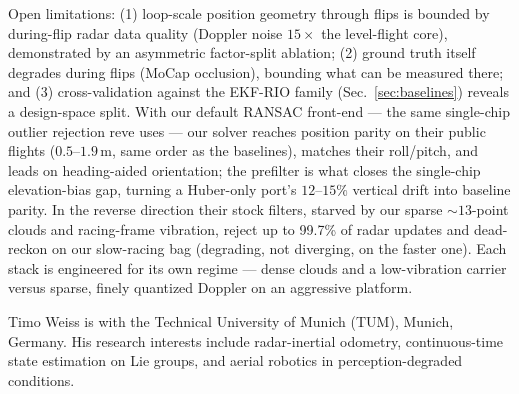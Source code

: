 \documentclass[journal]{IEEEtran}
\begin{document}
Open limitations: (1) loop-scale position geometry through flips is
bounded by during-flip radar data quality (Doppler noise
$15\times$ the level-flight core), demonstrated by an asymmetric
factor-split ablation; (2) ground truth itself degrades during flips
(MoCap occlusion), bounding what can be measured there; and
(3) cross-validation against the EKF-RIO family
(Sec.~\ref{sec:baselines}) reveals a design-space split.  With our
default RANSAC front-end --- the same single-chip outlier rejection
\mbox{reve} uses --- our solver reaches position parity on their public
flights ($0.5$--$1.9$\,m, same order as the baselines), matches their
roll/pitch, and leads on heading-aided orientation; the prefilter is
what closes the single-chip elevation-bias gap, turning a Huber-only
port's $12$--$15\%$ vertical drift into baseline parity.  In the reverse
direction their stock filters, starved by our sparse ${\sim}13$-point
clouds and racing-frame vibration, reject up to 99.7\% of radar updates
and dead-reckon on our slow-racing bag (degrading, not diverging, on the
faster one).  Each stack is engineered for its own regime --- dense
clouds and a low-vibration carrier versus sparse, finely quantized
Doppler on an aggressive platform.




\begin{IEEEbiographynophoto}{Timo Weiss}
is with the Technical University of Munich (TUM), Munich, Germany. His
research interests include radar-inertial odometry, continuous-time
state estimation on Lie groups, and aerial robotics in
perception-degraded conditions.
\end{IEEEbiographynophoto}
\end{document}
